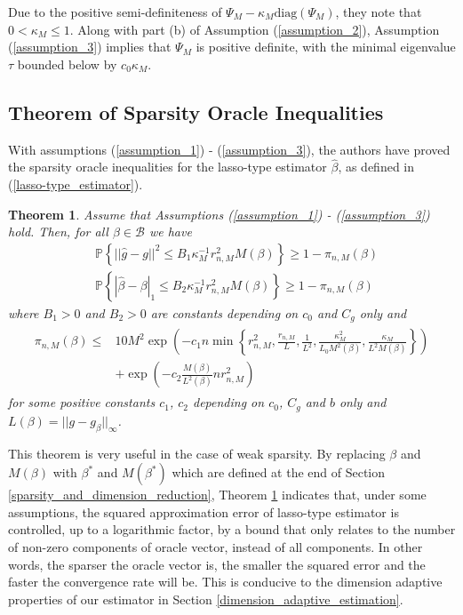 \documentclass[12pt, a4paper]{article}
\theoremstyle{MAstyle} \newtheorem{assumption}{Assumption}[section]
\theoremstyle{MAstyle} \newtheorem{definition}{Definition}[section]
\theoremstyle{MAstyle} \newtheorem{theorem}{Theorem}[section]
\theoremstyle{MAstyle} \newtheorem{corollary}{Corollary}[section]
\begin{document}
            Due to the positive semi-definiteness of $\Psi_M-\kappa_M\mathrm{diag}(\Psi_M)$, they note that $0< \kappa_M \le 1$. Along with part (b) of Assumption (\ref{assumption_2}), Assumption (\ref{assumption_3}) implies that $\Psi_M$ is positive definite, with the minimal eigenvalue $\tau$ bounded below by $c_0\kappa_M$. 
            
            \subsection{Theorem of Sparsity Oracle Inequalities}\label{sparsity_oracle_inequalities}

            With assumptions (\ref{assumption_1}) - (\ref{assumption_3}), the authors have proved the sparsity oracle inequalities for the lasso-type estimator $\widehat{\beta}$, as defined in (\ref{lasso-type_estimator}).

            \begin{theorem}\label{oracle_inequalities_theorem}
                Assume that Assumptions (\ref{assumption_1}) - (\ref{assumption_3}) hold. Then, for all $\beta \in \mathcal{B}$ we have
                \begin{align}
                    &\mathbb{P}\left\{ ||\widehat{g}-g||^2 \le B_1 \kappa_M^{-1} r_{n,M}^2 M(\beta) \right\} \ge  1-\pi_{n,M}(\beta)\\
                    &\mathbb{P}\left\{ |\widehat{\beta}-\beta|_1 \le B_2 \kappa_M^{-1} r_{n,M}^2 M(\beta) \right\} \ge 1-\pi_{n,M}(\beta)
                \end{align}
                where $B_1>0$ and $B_2>0$ are constants depending on $c_0$ and $C_g$ only and
                \begin{align}\label{pi_n_M}
                \begin{split}
                    \pi_{n,M}(\beta) \le & 10M^2 \exp\left( -c_1n \min \left\{ r_{n,M}^2, \frac{r_{n,M}}{L}, \frac{1}{L^2}, \frac{\kappa_M^2}{L_0 M^2(\beta)}, \frac{\kappa_M}{L^2M(\beta)} \right\} \right)\\
                    & +\exp\left( -c_2 \frac{M(\beta)}{L^2(\beta)}nr_{n,M}^2 \right)
                \end{split}
                \end{align}
                for some positive constants $c_1$, $c_2$ depending on $c_0$, $C_g$ and $b$ only and $L(\beta)=||g-g_{\beta}||_{\infty}$.
            \end{theorem}

            This theorem is very useful in the case of weak sparsity. By replacing $\beta$ and $M(\beta)$ with $\beta^*$ and $M(\beta^*)$ which are defined at the end of Section \ref{sparsity_and_dimension_reduction}, Theorem \ref{oracle_inequalities_theorem} indicates that, under some assumptions, the squared approximation error of lasso-type estimator is controlled, up to a logarithmic factor, by a bound that only relates to the number of non-zero components of oracle vector, instead of all components. In other words, the sparser the oracle vector is, the smaller the squared error and the faster the convergence rate will be. This is conducive to the dimension adaptive properties of our estimator in Section \ref{dimension_adaptive_estimation}.
\end{document}
